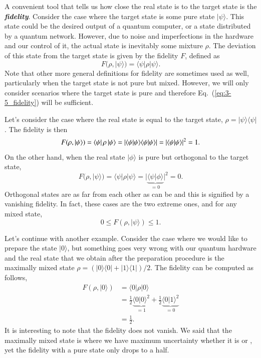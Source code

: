 A convenient tool that tells us how close the real state is to the target state is the \textit{\textbf{fidelity}}.
Consider the case where the target state is some pure state $|\psi\rangle$.
This state could be the desired output of a quantum computer, or a state distributed by a quantum network.
However, due to noise and imperfections in the hardware and our control of it, the actual state is inevitably some mixture $\rho$.
The deviation of this state from the target state is given by the fidelity $F$, defined as
\begin{equation}
    F(\rho,|\psi\rangle) = \langle\psi|\rho|\psi\rangle.
    \label{eq:3-5_fidelity}
\end{equation}
Note that other more general definitions for fidelity are sometimes used as well, particularly when the target state is not pure but mixed.
However, we will only consider scenarios where the target state is pure and therefore Eq.~(\ref{eq:3-5_fidelity}) will be sufficient.

Let's consider the case where the real state is equal to the target state, $\rho=|\psi\rangle\langle\psi|$.
The fidelity is then
\begin{equation}
    F(\rho,|\psi\rangle) = \left\langle \psi \right|\rho\left| \psi \right\rangle = |\langle \psi|\psi \rangle\langle \psi|\psi \rangle| = |\langle \psi|\psi \rangle|^2 = 1.
\end{equation}
On the other hand, when the real state $|\phi\rangle$ is pure but orthogonal to the target state,
\begin{equation}
    F(\rho,|\psi\rangle) = \langle\psi|\rho|\psi\rangle = |\underbrace{\langle \psi|\phi \rangle}_{=0}|^2 = 0.
\end{equation}
Orthogonal states are as far from each other as can be and this is signified by a vanishing fidelity.
In fact, these cases are the two extreme ones, and for any mixed state,
\begin{equation}
    0 \leq F(\rho,|\psi\rangle) \leq 1.
\end{equation}

Let's continue with another example.
Consider the case where we would like to prepare the state $|0\rangle$, but something goes very wrong with our quantum hardware and the real state that we obtain after the preparation procedure is the maximally mixed state $\rho = (|0\rangle\langle0| + |1\rangle\langle1|)/2$.
The fidelity can be computed as follows,
\begin{align}
    F(\rho,|0\rangle) & = \langle 0 | \rho | 0 \rangle \nonumber\\
    & = \frac{1}{2} \underbrace{\langle0|0\rangle^2}_{=1} + \frac{1}{2} \underbrace{\langle0|1\rangle^2}_{=0} \nonumber\\
    & = \frac{1}{2}.
\end{align}
It is interesting to note that the fidelity does not vanish.
We said that the maximally mixed state is where we have maximum uncertainty whether it is  or , yet the fidelity with a pure state only drops to a half.

